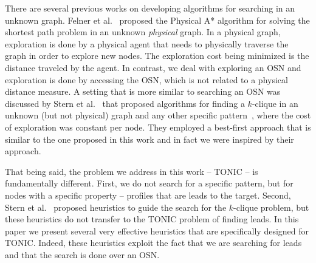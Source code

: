 \documentclass[journal]{IEEEtran}
\begin{document}

There are several previous works on developing algorithms for searching in an unknown graph. Felner et al.~\cite{felner2004pha} proposed the Physical A* algorithm for solving the shortest path problem in an unknown {\em physical} graph. In a physical graph, exploration is done by a physical agent that needs to physically traverse the graph in order to explore new nodes. The exploration cost being minimized is the distance traveled by the agent. 
In contrast, we deal with exploring an OSN and exploration is done by accessing the OSN, which is not related to a physical distance measure. A setting that is more similar to searching an OSN was discussed by Stern et al.~\cite{stern2010searchingForSOCS} that proposed algorithms for finding a $k$-clique in an unknown (but not physical) graph and any other specific pattern~\cite{stern2012findingPatterns}, where the cost of exploration was constant per node. They employed a best-first approach that is similar to the one proposed in this work and in fact we were inspired by their approach.

That being said, the problem we address in this work -- TONIC -- is  fundamentally different. First, we do not search for a specific pattern, but for nodes with a specific property -- profiles that are leads to the target. 
Second, Stern et al.~\cite{stern2012findingPatterns} proposed heuristics to guide the search for the $k$-clique problem, but these heuristics do not transfer to the TONIC problem of finding leads. In this paper we present several very effective heuristics that are specifically designed for TONIC. Indeed, these heuristics exploit the fact that we are searching for leads and that the search is done over an OSN. 

\end{document}
